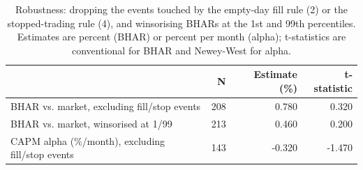 \begin{table}
\caption{Robustness: dropping the events touched by the empty-day fill rule (2) or the stopped-trading rule (4), and winsorising BHARs at the 1st and 99th percentiles. Estimates are percent (BHAR) or percent per month (alpha); t-statistics are conventional for BHAR and Newey-West for alpha.}
\label{tab:rob}
\begin{tabular}{p{8cm}rrr}
\toprule
 & N & Estimate (\%) & t-statistic \\
\midrule
BHAR vs. market, excluding fill/stop events & 208 & 0.780 & 0.320 \\
BHAR vs. market, winsorised at 1/99 & 213 & 0.460 & 0.200 \\
CAPM alpha (\%/month), excluding fill/stop events & 143 & -0.320 & -1.470 \\
\bottomrule
\end{tabular}
\end{table}

